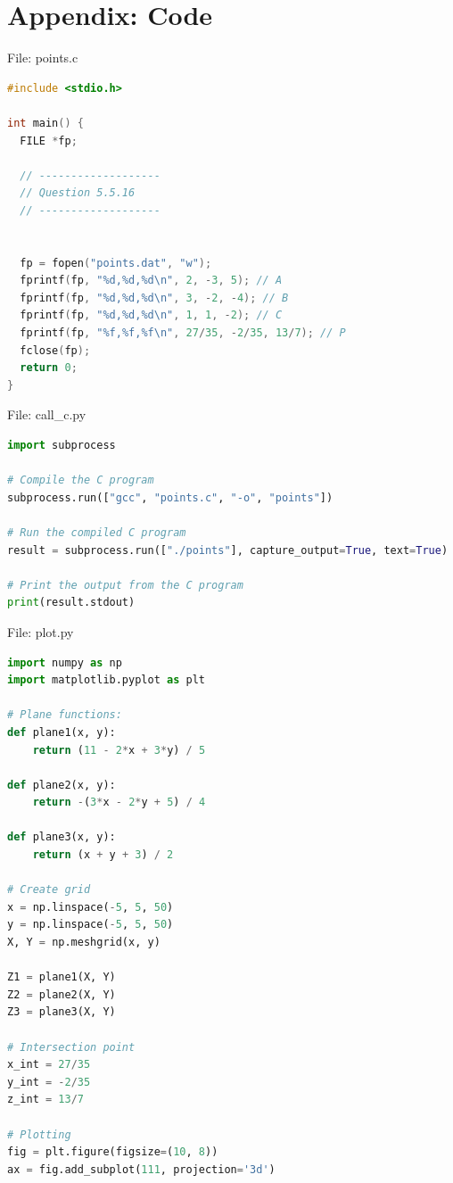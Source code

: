 \documentclass{beamer}
\numberwithin{equation}{section}
\theoremstyle{remark}
\begin{document}
\section*{Appendix: Code}

\begin{frame}[fragile]{File: points.c}
\begin{lstlisting}[language=C]
#include <stdio.h>

int main() {
  FILE *fp;

  // -------------------
  // Question 5.5.16
  // -------------------


  fp = fopen("points.dat", "w");
  fprintf(fp, "%d,%d,%d\n", 2, -3, 5); // A
  fprintf(fp, "%d,%d,%d\n", 3, -2, -4); // B
  fprintf(fp, "%d,%d,%d\n", 1, 1, -2); // C
  fprintf(fp, "%f,%f,%f\n", 27/35, -2/35, 13/7); // P
  fclose(fp);
  return 0;
}
\end{lstlisting}
\end{frame}

\begin{frame}[fragile]{File: call\_c.py}
\begin{lstlisting}[language=Python]
import subprocess

# Compile the C program
subprocess.run(["gcc", "points.c", "-o", "points"])

# Run the compiled C program
result = subprocess.run(["./points"], capture_output=True, text=True)

# Print the output from the C program
print(result.stdout)
\end{lstlisting}
\end{frame}

\begin{frame}[fragile]{File: plot.py}
\begin{lstlisting}[language=Python]
import numpy as np
import matplotlib.pyplot as plt

# Plane functions:
def plane1(x, y):
    return (11 - 2*x + 3*y) / 5

def plane2(x, y):
    return -(3*x - 2*y + 5) / 4

def plane3(x, y):
    return (x + y + 3) / 2

# Create grid
x = np.linspace(-5, 5, 50)
y = np.linspace(-5, 5, 50)
X, Y = np.meshgrid(x, y)

Z1 = plane1(X, Y)
Z2 = plane2(X, Y)
Z3 = plane3(X, Y)

# Intersection point
x_int = 27/35
y_int = -2/35
z_int = 13/7

# Plotting
fig = plt.figure(figsize=(10, 8))
ax = fig.add_subplot(111, projection='3d')
\end{lstlisting}
\end{frame}
\end{document}
